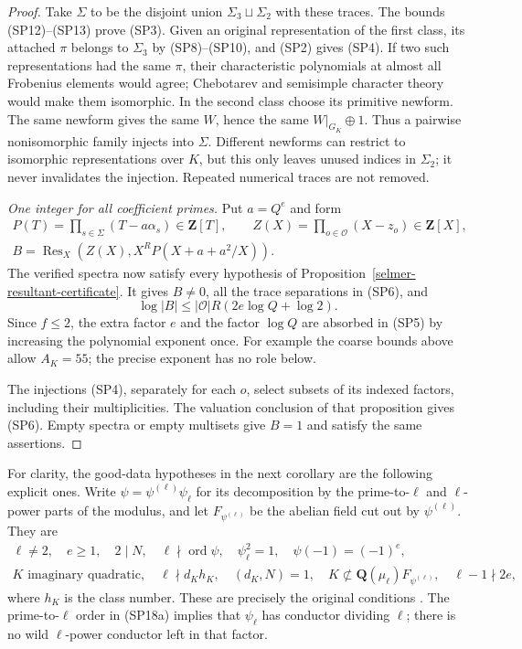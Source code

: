 \begin{proof}
Take $\Sigma$ to be the disjoint union $\Sigma_3\sqcup\Sigma_2$
with these traces.  The bounds (SP12)--(SP13) prove (SP3).
Given an original representation of the first class, its
attached $\pi$ belongs to $\Sigma_3$ by (SP8)--(SP10), and
(SP2) gives (SP4).  If two such representations had the same
$\pi$, their characteristic polynomials at almost all
Frobenius elements would agree; Chebotarev and semisimple
character theory would make them isomorphic.  In the second
class choose its primitive newform.  The same newform gives
the same $W$, hence the same $W|_{G_K}\oplus1$.
Thus a pairwise nonisomorphic family injects into $\Sigma$.
Different newforms can restrict to isomorphic representations
over $K$, but this only leaves unused indices in $\Sigma_2$;
it never invalidates the injection.  Repeated numerical
traces are not removed.

\emph{One integer for all coefficient primes.}
Put $a=Q^e$ and form
\[
 \begin{gathered}
 P(T)=\prod_{s\in\Sigma}(T-a\alpha_s)\in\mathbf Z[T],\qquad
 Z(X)=\prod_{o\in\mathcal O}(X-z_o)\in\mathbf Z[X],\\
 B=\operatorname{Res}_X\!\left(Z(X),X^R P(X+a+a^2/X)\right).
 \end{gathered}
                                                               \tag{SP16}
\]
The verified spectra now satisfy every hypothesis of
Proposition~\ref{selmer-resultant-certificate}.  It gives
$B\ne0$, all the trace separations in (SP6), and
\[
             \log|B|\le |\mathcal O|R(2e\log Q+\log2).        \tag{SP17}
\]
Since $f\le2$, the extra factor $e$ and the factor $\log Q$
are absorbed in (SP5) by increasing the polynomial exponent
once.  For example the coarse bounds above allow $A_K=55$;
the precise exponent has no role below.

The injections (SP4), separately for each $o$, select
subsets of its indexed factors, including their multiplicities.
The valuation conclusion of that proposition gives (SP6).
Empty spectra or empty multisets give $B=1$ and satisfy
the same assertions.
\end{proof}

For clarity, the good-data hypotheses in the next corollary are
the following explicit ones.  Write
$\psi=\psi^{(\ell)}\psi_\ell$ for its decomposition by the
prime-to-$\ell$ and $\ell$-power parts of the modulus, and let
$F_{\psi^{(\ell)}}$ be the abelian field cut out by
$\psi^{(\ell)}$.  They are
\[
 \begin{gathered}
 \ell\ne2,\quad e\ge1,\quad 2\mid N,\quad
 \ell\nmid\operatorname{ord}\psi,\quad \psi_\ell^2=1,
 \quad\psi(-1)=(-1)^e,\\
 K\text{ imaginary quadratic},\quad
 \ell\nmid d_K h_K,\quad (d_K,N)=1,\quad
 K\not\subset\mathbf Q(\mu_\ell)F_{\psi^{(\ell)}},\quad
 \ell-1\nmid2e,
 \end{gathered}                                                \tag{SP18a}
\]
where $h_K$ is the class number.  These are precisely the
original conditions \cite{support-spectrum-orbit-source}.
The prime-to-$\ell$ order in (SP18a) implies that
$\psi_\ell$ has conductor dividing $\ell$; there is no
wild $\ell$-power conductor left in that factor.

